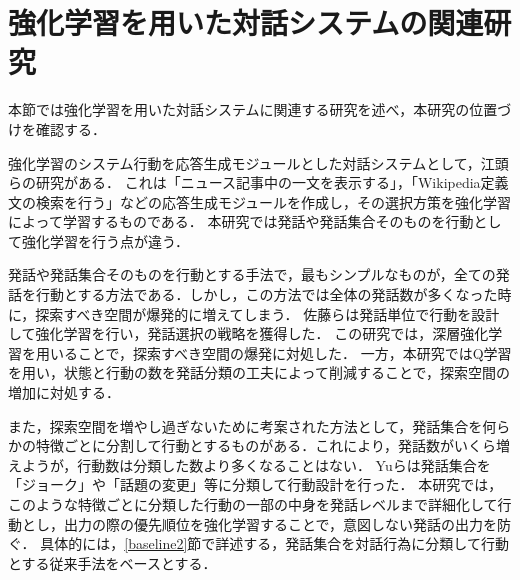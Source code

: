 \documentclass[12pt,a4paper,twoside,openany]{jbook}
\begin{document}
\section{強化学習を用いた対話システムの関連研究}\label{kanren}
本節では強化学習を用いた対話システムに関連する研究を述べ，本研究の位置づけを確認する．


強化学習のシステム行動を応答生成モジュールとした対話システムとして，江頭らの研究\cite{egashira}がある．
これは「ニュース記事中の一文を表示する」，「Wikipedia定義文の検索を行う」などの応答生成モジュールを作成し，その選択方策を強化学習によって学習するものである．
本研究では発話や発話集合そのものを行動として強化学習を行う点が違う．

発話や発話集合そのものを行動とする手法で，最もシンプルなものが，全ての発話を行動とする方法である．しかし，この方法では全体の発話数が多くなった時に，探索すべき空間が爆発的に増えてしまう．
佐藤ら\cite{satoh}は発話単位で行動を設計して強化学習を行い，発話選択の戦略を獲得した．
この研究では，深層強化学習を用いることで，探索すべき空間の爆発に対処した．
一方，本研究ではQ学習を用い，状態と行動の数を発話分類の工夫によって削減することで，探索空間の増加に対処する．

また，探索空間を増やし過ぎないために考案された方法として，発話集合を何らかの特徴ごとに分割して行動とするものがある．これにより，発話数がいくら増えようが，行動数は分類した数より多くなることはない．
Yuら\cite{yu}は発話集合を「ジョーク」や「話題の変更」等に分類して行動設計を行った．
本研究では，このような特徴ごとに分類した行動の一部の中身を発話レベルまで詳細化して行動とし，出力の際の優先順位を強化学習することで，意図しない発話の出力を防ぐ．
具体的には，\ref{baseline2}節で詳述する，発話集合を対話行為に分類して行動とする従来手法をベースとする．
\end{document}
